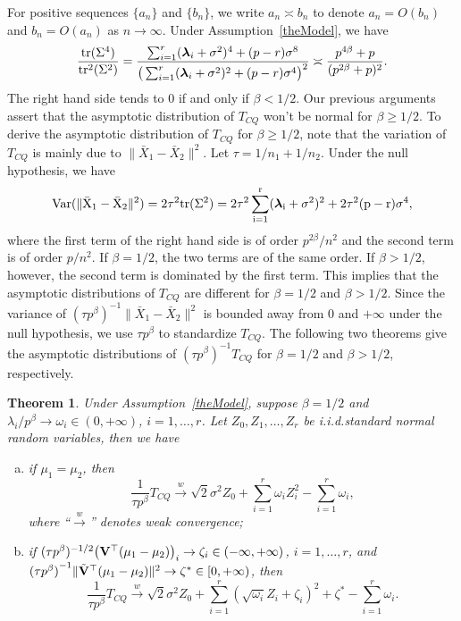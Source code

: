 \documentclass[times,sort&compress,3p]{elsarticle}
\newcommand{\mytr}{\rm tr}
\newcommand{\myVar}{\rm Var}
\newcommand{\bfsym}[1]{\ensuremath{\boldsymbol{#1}}}
\def\blambda {\bfsym {\lambda}}        \def\bLambda {\bfsym {\Lambda}}
\theoremstyle{plain}
\newtheorem{theorem}{\quad\quad Theorem}
\theoremstyle{definition}
\theoremstyle{remark}
\begin{document}
For positive sequences $\{a_n\}$ and $\{b_n\}$, we write $a_n\asymp b_n$ to denote $a_n=O(b_n)$ and $b_n=O(a_n)$ as $n\to \infty$.
Under Assumption~\ref{theModel}, we have
$$
\frac{\mytr(\bSigma^4)}{\mytr^2(\bSigma^2)}=
\frac{\sum_{i=1}^r (\blambda_i+\sigma^2)^4+(p-r)\sigma^8}{\big(\sum_{i=1}^r (\blambda_i+\sigma^2)^2+(p-r)\sigma^4\big)^2}\asymp \frac{p^{4\beta}+p}{(p^{2\beta}+p)^2}.
$$
The right hand side tends to $0$ if and only if $\beta<1/2$.
Our previous arguments assert that the asymptotic distribution of $T_{CQ}$ won't be normal for $\beta\geq 1/2$.
To derive the asymptotic distribution of $T_{CQ}$ for $\beta\geq 1/2$,
note that the variation of $T_{CQ}$ is mainly due to $\|\bar{X}_1-\bar{X}_2\|^2$.
Let $\tau=1/n_1+1/n_2$.
Under the null hypothesis, we have
$$
\myVar(\|\bar{X}_1-\bar{X}_2\|^2)=
2\tau^2 \mytr (\bSigma^2)=2\tau^2 \sum_{i=1}^r (\blambda_i+
\sigma^2)^2
+ 2\tau^2 (p-r)\sigma^4,
$$
where the first term of the right hand side is of order $p^{2\beta}/n^2$ and the second term is of order $p/n^2$.
If $\beta=1/2$, the two terms are of the same order. 
If $\beta>1/2$, however, the second term is dominated by the first term.
This implies that the asymptotic distributions of $T_{CQ}$ are different for $\beta=1/2$ and $\beta>1/2$.
Since the variance of $(\tau p^{\beta})^{-1}\|\bar{X}_1-\bar{X}_2\|^2$ is bounded away from $0$ and $+\infty$ under the null hypothesis, we use $\tau p^{\beta}$ to standardize $T_{CQ}$.
The following two theorems give the asymptotic distributions of $(\tau p^{\beta})^{-1}T_{CQ}$ for $\beta= 1/2$ and $\beta>1/2$, respectively.
\begin{theorem}\label{Chenstheory1}
 Under Assumption~\ref{theModel},
    suppose $\beta=1/2$ and $\lambda_i/p^\beta \to \omega_i\in(0,+\infty)$, $i=1,\ldots,r$.
    Let $Z_{0},Z_1,\ldots,Z_{r}$ be i.i.d.\@ standard normal random variables,
     then we have
     \begin{enumerate}[(a)]
         \item
             if $\mu_1=\mu_2$, then
    $$
        \frac{1}{\tau p^{\beta}} T_{CQ}
        \xrightarrow{w}
\sqrt{2}\sigma^2 Z_0
+
        \sum_{i=1}^r \omega_i Z_i^2
            -
        \sum_{i=1}^r \omega_i,
    $$
             where ``$\xrightarrow{w}$'' denotes weak convergence;
         \item
             if $(\tau p^{\beta})^{-1/2}\big(\mathbf{V}^\top  (\mu_1-\mu_2)\big)_i\to \zeta_i\in(-\infty,+\infty)$, $i=1,\ldots,r$,
             and
    ${(\tau p^\beta)}^{-1}\|\tilde{\mathbf{V}}^\top  (\mu_1-\mu_2)\|^2\to \zeta^*\in [0,+\infty)$, then
    $$
        \frac{1}{\tau p^{\beta}} T_{CQ}
        \xrightarrow{w}
\sqrt{2}\sigma^2 Z_0+
        \sum_{i=1}^r (\sqrt{\omega_i} Z_i+\zeta_i)^2+
\zeta^*
        -
        \sum_{i=1}^r \omega_i.
    $$
     \end{enumerate}
\end{theorem}
\end{document}
